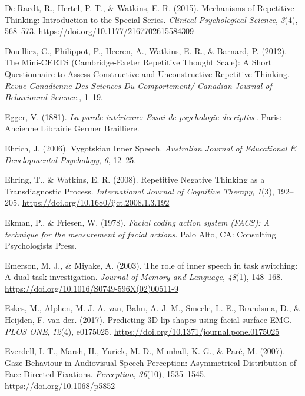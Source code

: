 \documentclass[a4paper,12pt,twoside,openright,oldfontcommands]{memoir}
\begin{document}
\leavevmode\hypertarget{ref-de_raedt_mechanisms_2015}{}%
De Raedt, R., Hertel, P. T., \& Watkins, E. R. (2015). Mechanisms of Repetitive Thinking: Introduction to the Special Series. \emph{Clinical Psychological Science}, \emph{3}(4), 568--573. \url{https://doi.org/10.1177/2167702615584309}

\leavevmode\hypertarget{ref-Douilliez2012}{}%
Douilliez, C., Philippot, P., Heeren, A., Watkins, E. R., \& Barnard, P. (2012). The Mini-CERTS (Cambridge-Exeter Repetitive Thought Scale): A Short Questionnaire to Assess Constructive and Unconstructive Repetitive Thinking. \emph{Revue Canadienne Des Sciences Du Comportement/ Canadian Journal of Behavioural Science.}, 1--19.

\leavevmode\hypertarget{ref-egger_parole_1881}{}%
Egger, V. (1881). \emph{La parole intérieure: Essai de psychologie decriptive}. Paris: Ancienne Librairie Germer Brailliere.

\leavevmode\hypertarget{ref-ehrich_vygotskian_2006}{}%
Ehrich, J. (2006). Vygotskian Inner Speech. \emph{Australian Journal of Educational \& Developmental Psychology}, \emph{6}, 12--25.

\leavevmode\hypertarget{ref-ehring_repetitive_2008}{}%
Ehring, T., \& Watkins, E. R. (2008). Repetitive Negative Thinking as a Transdiagnostic Process. \emph{International Journal of Cognitive Therapy}, \emph{1}(3), 192--205. \url{https://doi.org/10.1680/ijct.2008.1.3.192}

\leavevmode\hypertarget{ref-ekman_facial_1978}{}%
Ekman, P., \& Friesen, W. (1978). \emph{Facial coding action system (FACS): A technique for the measurement of facial actions}. Palo Alto, CA: Consulting Psychologists Press.

\leavevmode\hypertarget{ref-emerson_role_2003}{}%
Emerson, M. J., \& Miyake, A. (2003). The role of inner speech in task switching: A dual-task investigation. \emph{Journal of Memory and Language}, \emph{48}(1), 148--168. \url{https://doi.org/10.1016/S0749-596X(02)00511-9}

\leavevmode\hypertarget{ref-eskes_predicting_2017}{}%
Eskes, M., Alphen, M. J. A. van, Balm, A. J. M., Smeele, L. E., Brandsma, D., \& Heijden, F. van der. (2017). Predicting 3D lip shapes using facial surface EMG. \emph{PLOS ONE}, \emph{12}(4), e0175025. \url{https://doi.org/10.1371/journal.pone.0175025}

\leavevmode\hypertarget{ref-everdell_gaze_2007}{}%
Everdell, I. T., Marsh, H., Yurick, M. D., Munhall, K. G., \& Paré, M. (2007). Gaze Behaviour in Audiovisual Speech Perception: Asymmetrical Distribution of Face-Directed Fixations. \emph{Perception}, \emph{36}(10), 1535--1545. \url{https://doi.org/10.1068/p5852}
\end{document}
